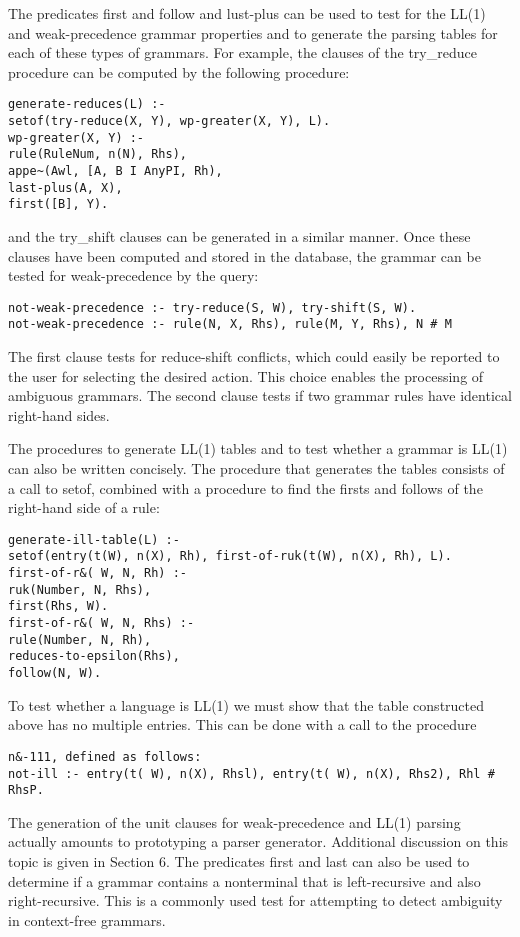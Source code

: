 The predicates first and follow and lust-plus can be used to test for the LL(1)
and weak-precedence grammar properties and to generate the parsing tables for
each of these types of grammars. For example, the clauses of the try\_reduce
procedure can be computed by the following procedure:
\begin{verbatim}
generate-reduces(L) :-
setof(try-reduce(X, Y), wp-greater(X, Y), L).
wp-greater(X, Y) :-
rule(RuleNum, n(N), Rhs),
appe~(Awl, [A, B I AnyPI, Rh),
last-plus(A, X),
first([B], Y). 
\end{verbatim}
and the try\_shift clauses can be generated in a similar manner. Once these
clauses have been computed and stored in the database, the grammar can be tested for
weak-precedence by the query:
\begin{verbatim}
not-weak-precedence :- try-reduce(S, W), try-shift(S, W).
not-weak-precedence :- rule(N, X, Rhs), rule(M, Y, Rhs), N # M 
\end{verbatim}
The first clause tests for reduce-shift conflicts, which could easily be reported to
the user for selecting the desired action. This choice enables the processing of
ambiguous grammars. The second clause tests if two grammar rules have identical
right-hand sides. 

The procedures to generate LL(1) tables and to test whether a grammar is
LL(1) can also be written concisely. The procedure that generates the tables
consists of a call to setof, combined with a procedure to find the firsts and follows
of the right-hand side of a rule:
\begin{verbatim}
generate-ill-table(L) :-
setof(entry(t(W), n(X), Rh), first-of-ruk(t(W), n(X), Rh), L).
first-of-r&( W, N, Rh) :-
ruk(Number, N, Rhs),
first(Rhs, W).
first-of-r&( W, N, Rhs) :-
rule(Number, N, Rh),
reduces-to-epsilon(Rhs),
follow(N, W). 
\end{verbatim}
To test whether a language is LL(1) we must show that the table constructed
above has no multiple entries. This can be done with a call to the procedure
\begin{verbatim}
n&-111, defined as follows:
not-ill :- entry(t( W), n(X), Rhsl), entry(t( W), n(X), Rhs2), Rhl # RhsP.
\end{verbatim}

The generation of the unit clauses for weak-precedence and LL(1) parsing
actually amounts to prototyping a parser generator. Additional discussion on this
topic is given in Section 6. The predicates first and last can also be used to
determine if a grammar contains a nonterminal that is left-recursive and also
right-recursive. This is a commonly used test for attempting to detect ambiguity
in context-free grammars. 

